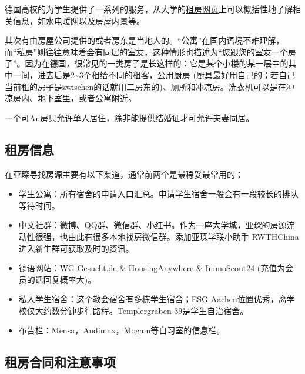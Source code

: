     德国高校的为学生提供了一系列的服务，从大学的\href{https://bewerberportal.stw.rwth-aachen.de/}{租房网页}上可以概括性地了解相关信息，如水电暖网以及房屋内景等。

    其次有由房屋公司提供的或者房东是当地人的。``公寓''在国内语境不难理解，而``私房''则往往意味着会有同居的室友，这种情形也描述为``您跟您的室友一个房子''。因为在德国，很常见的一类房子是长这样的：它是某个小楼的某一层中的其中一间，进去后是2\textasciitilde3个租给不同的租客，公用厨房 (厨具最好用自己的；若自己当前租的房子是zwischen的话就用二房东的)、厕所和冲凉房。洗衣机可以是在冲凉房内、地下室里，或者公寓附近。

    一个可An房只允许单人居住，除非能提供结婚证才可允许夫妻同居。

  \subsection{租房信息}\label{subsec:租房信息}

    在亚琛寻找房源主要有以下渠道，通常前两个是最稳妥最常用的：

    \begin{itemize}
      \item 学生公寓：所有宿舍的申请入口\href{https://bewerberportal.stw.rwth-aachen.de/}{汇总}。申请学生宿舍一般会有一段较长的排队等待时间。
      \item 中文社群：微博、QQ群、微信群、小红书。作为一座大学城，亚琛的房源流动性很强，也由此有很多本地找房微信群。添加亚琛学联小助手 RWTHChina 进入新生群可获取及时的资讯。
      \item 德语网站：\href{http://www.wg-gesucht.de}{WG-Gesucht.de} \& \href{http://www.studenten-wg.de}{HousingAnywhere} \& \href{https://www.immobilienscout24.de/}{ImmoScout24} (充值为会员的话回复概率大)。
      \item 私人学生宿舍：这个\href{http://www.stwkhg.de/}{教会宿舍}有多栋学生宿舍；\href{https://www.esg-aachen.de/}{ESG Aachen}位置优秀，离学校仅大约数分钟步行路程。\href{http://www.t39.rwth-aachen.de/}{Templergraben 39}是学生自治宿舍。
      \item 布告栏：Mensa，Audimax，Mogam等自习室的信息栏。
    \end{itemize}

  \subsection{租房合同和注意事项}\label{subsec:租房合同和注意事项}

